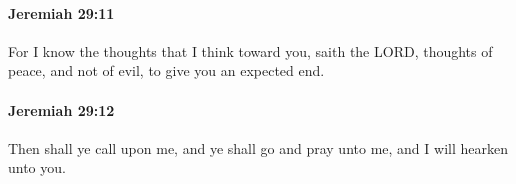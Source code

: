 		\paragraph{Jeremiah 29:11} %
			\label{JEREMIAH-29-11}

			For I know the thoughts that I think toward you, saith the LORD, thoughts of peace, and not of evil, to give you an expected end.


		\paragraph{Jeremiah 29:12} %
			\label{JEREMIAH-29-12}

			Then shall ye call upon me, and ye shall go and pray unto me, and I will hearken unto you.


